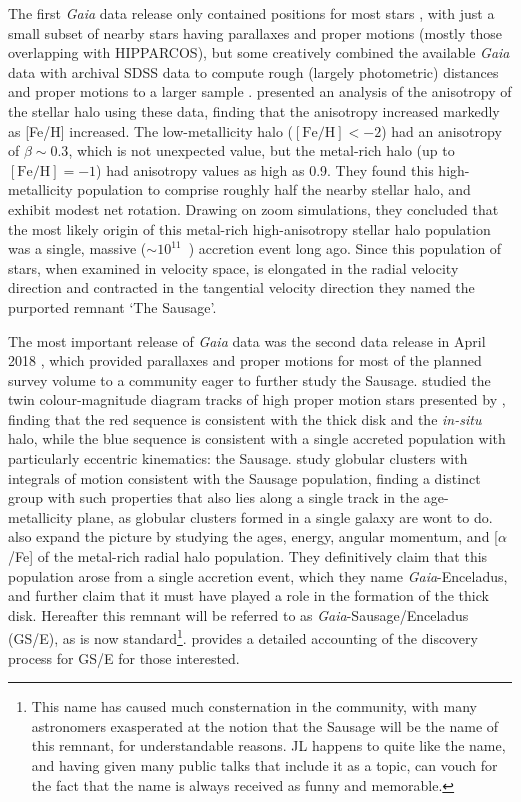 The first \textit{Gaia} data release only contained positions for most stars \parencite{gaiadr1}, with just a small subset of nearby stars having parallaxes and proper motions (mostly those overlapping with HIPPARCOS), but some creatively combined the available \textit{Gaia} data with archival SDSS data to compute rough (largely photometric) distances and proper motions to a larger sample \parencite{deason17,deboer18}. \textcite{belokurov18} presented an analysis of the anisotropy of the stellar halo using these data, finding that the anisotropy increased markedly as [Fe/H] increased. The low-metallicity halo ($\mathrm{[Fe/H]} < -2$) had an anisotropy of $\beta \sim 0.3$, which is not unexpected value, but the metal-rich halo (up to $\mathrm{[Fe/H]}=-1$) had anisotropy values as high as 0.9. They found this high-metallicity population to comprise roughly half the nearby stellar halo, and exhibit modest net rotation. Drawing on zoom simulations, they concluded that the most likely origin of this metal-rich high-anisotropy stellar halo population was a single, massive ($\sim 10^{11}$~\Msun) accretion event long ago. Since this population of stars, when examined in velocity space, is elongated in the radial velocity direction and contracted in the tangential velocity direction they named the purported remnant `The Sausage'.

The most important release of \textit{Gaia} data was the second data release in April 2018 \parencite{gaiadr2}, which provided parallaxes and proper motions for most of the planned survey volume to a community eager to further study the Sausage. \textcite{haywood18} studied the twin colour-magnitude diagram tracks of high proper motion stars presented by \textcite{gaiadr2_hrdiagram}, finding that the red sequence is consistent with the thick disk and the \textit{in-situ} halo, while the blue sequence is consistent with a single accreted population with particularly eccentric kinematics: the Sausage. \textcite{myeong18} study globular clusters with integrals of motion consistent with the Sausage population, finding a distinct group with such properties that also lies along a single track in the age-metallicity plane, as globular clusters formed in a single galaxy are wont to do. \textcite{helmi18} also expand the picture by studying the ages, energy, angular momentum, and [$\alpha$/Fe] of the metal-rich radial halo population. They definitively claim that this population arose from a single accretion event, which they name \textit{Gaia}-Enceladus, and further claim that it must have played a role in the formation of the thick disk. Hereafter this remnant will be referred to as \textit{Gaia}-Sausage/Enceladus (GS/E), as is now standard\footnote{This name has caused much consternation in the community, with many astronomers exasperated at the notion that the Sausage will be the name of this remnant, for understandable reasons. JL happens to quite like the name, and having given many public talks that include it as a topic, can vouch for the fact that the name is always received as funny and memorable.}. \textcite{deason24} provides a detailed accounting of the discovery process for GS/E for those interested.

